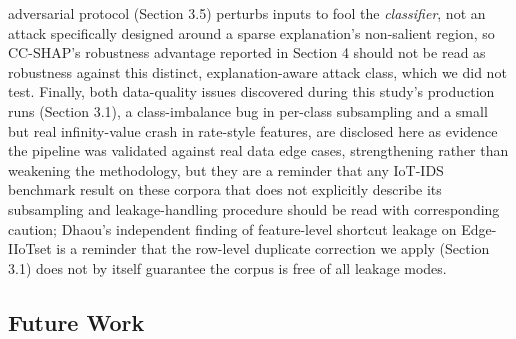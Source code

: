 adversarial protocol (Section 3.5) perturbs inputs to fool the \emph{classifier}, not an attack specifically designed around a sparse explanation's non-salient region, so CC-SHAP's robustness advantage reported in Section 4 should not be read as robustness against this distinct, explanation-aware attack class, which we did not test. Finally, both data-quality issues discovered during this study's production runs (Section 3.1), a class-imbalance bug in per-class subsampling and a small but real infinity-value crash in rate-style features, are disclosed here as evidence the pipeline was validated against real data edge cases, strengthening rather than weakening the methodology, but they are a reminder that any IoT-IDS benchmark result on these corpora that does not explicitly describe its subsampling and leakage-handling procedure should be read with corresponding caution; Dhaou's independent finding \citep{ref23} of feature-level shortcut leakage on Edge-IIoTset is a reminder that the row-level duplicate correction we apply (Section 3.1) does not by itself guarantee the corpus is free of all leakage modes.

\subsection{Future Work}\label{future-work}

